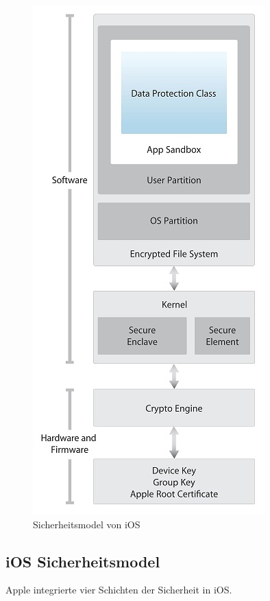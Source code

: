 	\begin{figure}
		\includegraphics[width=\linewidth]{ios/media/security-model.jpg}
		\caption{Sicherheitsmodel von iOS}
		\label{fig:security-model}
	\end{figure}
	\subsection{iOS Sicherheitsmodel}
	Apple integrierte vier Schichten der Sicherheit in iOS.\\